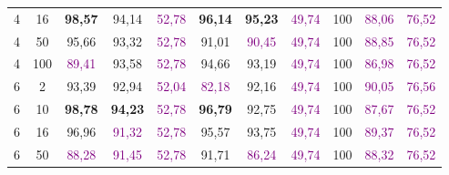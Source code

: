 \begin{table}[ht]
\begin{tabular}{cc|ccc|ccc|ccc}
        {4}                           & {16}    & \textbf{98,57}                      & {94,14}                             & \textcolor{purple}{52,78}                & \textbf{96,14}                  & \textbf{95,23}                  & \textcolor{purple}{49,74}      & {100}                           & \textcolor{purple}{88,06}       & \textcolor{purple}{76,52}      \\
        {4}                           & {50}    & {95,66}                             & {93,32}                             & \textcolor{purple}{52,78}                & {91,01}                         & \textcolor{purple}{90,45}       & \textcolor{purple}{49,74}      & {100}                           & \textcolor{purple}{88,85}       & \textcolor{purple}{76,52}      \\
        {4}                           & {100}   & \textcolor{purple}{89,41}           & {93,58}                             & \textcolor{purple}{52,78}                & {94,66}                         & {93,19}                         & \textcolor{purple}{49,74}      & {100}                           & \textcolor{purple}{86,98}       & \textcolor{purple}{76,52}      \\
        {6}                           & {2}     & {93,39}                             & {92,94}                             & \textcolor{purple}{52,04}                & \textcolor{purple}{82,18}       & {92,16}                         & \textcolor{purple}{49,74}      & {100}                           & \textcolor{purple}{90,05}       & \textcolor{purple}{76,56}      \\
        {6}                           & {10}    & \textbf{98,78}                      & \textbf{94,23}                      & \textcolor{purple}{52,78}                & \textbf{96,79}                  & {92,75}                         & \textcolor{purple}{49,74}      & {100}                           & \textcolor{purple}{87,67}       & \textcolor{purple}{76,52}      \\
        {6}                           & {16}    & {96,96}                             & \textcolor{purple}{91,32}           & \textcolor{purple}{52,78}                & {95,57}                         & {93,75}                         & \textcolor{purple}{49,74}      & {100}                           & \textcolor{purple}{89,37}       & \textcolor{purple}{76,52}      \\
        {6}                           & {50}    & \textcolor{purple}{88,28}           & \textcolor{purple}{91,45}           & \textcolor{purple}{52,78}                & {91,71}                         & \textcolor{purple}{86,24}       & \textcolor{purple}{49,74}      & {100}                           & \textcolor{purple}{88,32}       & \textcolor{purple}{76,52}      \\

\end{tabular}
\end{table}
